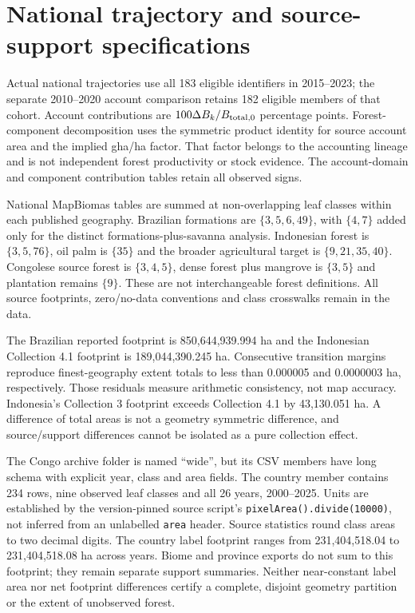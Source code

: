 \section{National trajectory and source-support specifications}\label{sec:SI_national}
Actual national trajectories use all 183 eligible identifiers in 2015--2023; the separate 2010--2020 account comparison retains 182 eligible members of that cohort. Account contributions are $100\Delta B_k/B_{\rm total,0}$ percentage points. Forest-component decomposition uses the symmetric product identity for source account area and the implied gha/ha factor. That factor belongs to the accounting lineage and is not independent forest productivity or stock evidence. The account-domain and component contribution tables retain all observed signs.

National MapBiomas tables are summed at non-overlapping leaf classes within each published geography. Brazilian formations are $\{3,5,6,49\}$, with $\{4,7\}$ added only for the distinct formations-plus-savanna analysis. Indonesian forest is $\{3,5,76\}$, oil palm is $\{35\}$ and the broader agricultural target is $\{9,21,35,40\}$. Congolese source forest is $\{3,4,5\}$, dense forest plus mangrove is $\{3,5\}$ and plantation remains $\{9\}$. These are not interchangeable forest definitions. All source footprints, zero/no-data conventions and class crosswalks remain in the data.

The Brazilian reported footprint is 850,644,939.994 ha and the Indonesian Collection 4.1 footprint is 189,044,390.245 ha. Consecutive transition margins reproduce finest-geography extent totals to less than 0.000005 and 0.0000003 ha, respectively. Those residuals measure arithmetic consistency, not map accuracy. Indonesia's Collection 3 footprint exceeds Collection 4.1 by 43,130.051 ha. A difference of total areas is not a geometry symmetric difference, and source/support differences cannot be isolated as a pure collection effect.

The Congo archive folder is named ``wide'', but its CSV members have long schema with explicit year, class and area fields. The country member contains 234 rows, nine observed leaf classes and all 26 years, 2000--2025. Units are established by the version-pinned source script's \texttt{pixelArea().divide(10000)}, not inferred from an unlabelled \texttt{area} header. Source statistics round class areas to two decimal digits. The country label footprint ranges from 231,404,518.04 to 231,404,518.08 ha across years. Biome and province exports do not sum to this footprint; they remain separate support summaries. Neither near-constant label area nor net footprint differences certify a complete, disjoint geometry partition or the extent of unobserved forest.

